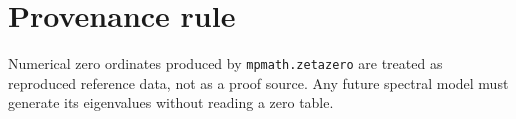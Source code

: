 \section{Provenance rule}
Numerical zero ordinates produced by \texttt{mpmath.zetazero} are treated as reproduced reference data, not as a proof source. Any future spectral model must generate its eigenvalues without reading a zero table.
